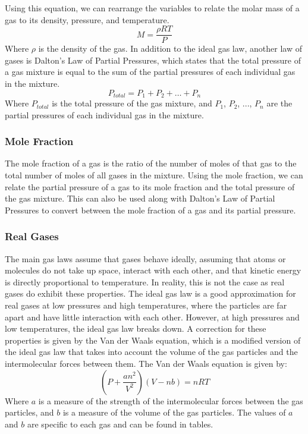 Using this equation, we can rearrange the variables to relate the molar mass of a gas to its density, pressure, and temperature.
\begin{equation}\label{eq:molar_mass}
    M = \frac{\rho RT}{P}
\end{equation}
Where $\rho$ is the density of the gas. 
In addition to the ideal gas law, another law of gases is Dalton's Law of Partial Pressures, which states that the total pressure of a gas mixture is equal to the sum of the partial pressures of each individual gas in the mixture.
\begin{equation}\label{eq:dalton}
    P_{total} = P_1 + P_2 + \dots + P_n
\end{equation}
Where $P_{total}$ is the total pressure of the gas mixture, and $P_1$, $P_2$, ..., $P_n$ are the partial pressures of each individual gas in the mixture. 
\subsubsection{Mole Fraction}
The mole fraction of a gas is the ratio of the number of moles of that gas to the total number of moles of all gases in the mixture. Using the mole fraction, we can relate the partial pressure of a gas to its mole fraction and the total pressure of the gas mixture. This can also be used along with Dalton's Law of Partial Pressures to convert between the mole fraction of a gas and its partial pressure.
\subsubsection{Real Gases}
The main gas laws assume that gases behave ideally, assuming that atoms or molecules do not take up space, interact with each other, and that kinetic energy is directly proportional to temperature. In reality, this is not the case as real gases do exhibit these properties. The ideal gas law is a good approximation for real gases at low pressures and high temperatures, where the particles are far apart and have little interaction with each other. However, at high pressures and low temperatures, the ideal gas law breaks down. A correction for these properties is given by the Van der Waals equation, which is a modified version of the ideal gas law that takes into account the volume of the gas particles and the intermolecular forces between them. The Van der Waals equation is given by:
\begin{equation}\label{eq:vanderwaals}
    \left(P + \frac{an^2}{V^2}\right)(V - nb) = nRT
\end{equation}
Where $a$ is a measure of the strength of the intermolecular forces between the gas particles, and $b$ is a measure of the volume of the gas particles. The values of $a$ and $b$ are specific to each gas and can be found in tables.
